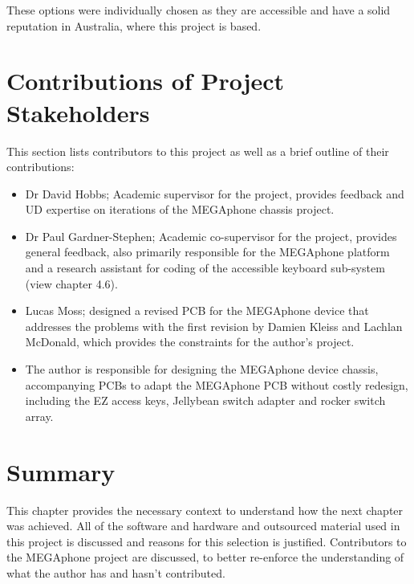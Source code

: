 These options were individually chosen as they are accessible and have a solid reputation in Australia, where this project is based.

\section{Contributions of Project Stakeholders} 

This section lists contributors to this project as well as a brief outline of their contributions:

\begin{itemize} 
    \item Dr David Hobbs; Academic supervisor for the project, provides feedback and UD expertise on iterations of the MEGAphone chassis project.
    \item Dr Paul Gardner-Stephen; Academic co-supervisor for the project, provides general feedback, also primarily responsible for the MEGAphone platform and a research assistant for coding of the accessible keyboard sub-system (view chapter 4.6).
    \item Lucas Moss; designed a revised PCB for the MEGAphone device that addresses the problems with the first revision by Damien Kleiss and Lachlan McDonald, which provides the constraints for the author's project.
    \item The author is responsible for designing the MEGAphone device chassis, accompanying PCBs to adapt the MEGAphone PCB without costly redesign, including the EZ access keys, Jellybean switch adapter and rocker switch array.
\end{itemize}


\section{Summary}

This chapter provides the necessary context to understand how the next chapter was achieved.
All of the software and hardware and outsourced material used in this project is discussed and reasons for this selection is justified.
Contributors to the MEGAphone project are discussed, to better re-enforce the understanding of what the author has and hasn't contributed.